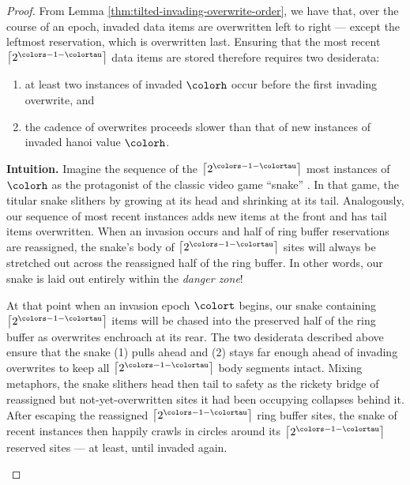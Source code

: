 \begin{proof}
From Lemma \ref{thm:tilted-invading-overwrite-order}, we have that, over the course of an epoch, invaded data items are overwritten left to right --- except the leftmost reservation, which is overwritten last.
Ensuring that the most recent $\left\lceil 2^{\colors - 1 - \colortau} \right\rceil$ data items are stored therefore requires two desiderata:
\begin{enumerate}
\item at least two instances of invaded \hv{} $\colorh$ occur before the first invading overwrite, and
\item the cadence of overwrites proceeds slower than that of new instances of invaded hanoi value $\colorh$.
\end{enumerate}


\begin{mybox}
\textbf{Intuition.}
Imagine the sequence of the $\left\lceil 2^{\colors - 1 - \colortau} \right\rceil$ most instances of \hv{} $\colorh$ as the protagonist of the classic video game ``snake'' \citep{de2016complexity}.
In that game, the titular snake slithers by growing at its head and shrinking at its tail.
Analogously, our sequence of most recent \hv{} instances adds new items at the front and has tail items overwritten.
When an invasion occurs and half of ring buffer reservations are reassigned, the snake's body of $\left\lceil 2^{\colors - 1 - \colortau} \right\rceil$ sites will always be stretched out across the reassigned half of the ring buffer.
In other words, our snake is laid out entirely within the \textit{danger zone}!

At that point when an invasion epoch $\colort$ begins, our snake containing $\left\lceil 2^{\colors - 1 - \colortau} \right\rceil$ items will be chased into the preserved half of the ring buffer as overwrites enchroach at its rear.
The two desiderata described above ensure that the snake (1) pulls ahead and (2) stays far enough ahead of invading overwrites to keep all $\left\lceil 2^{\colors - 1 - \colortau} \right\rceil$ body segments intact.
Mixing metaphors, the snake slithers head then tail to safety as the rickety bridge of reassigned but not-yet-overwritten sites it had been occupying collapses behind it.
After escaping the reassigned $\left\lceil 2^{\colors - 1 - \colortau} \right\rceil$ ring buffer sites, the snake of recent \hv{} instances then happily crawls in circles around its $\left\lceil 2^{\colors - 1 - \colortau} \right\rceil$ reserved sites --- at least, until invaded again.
\end{mybox}


\end{proof}
